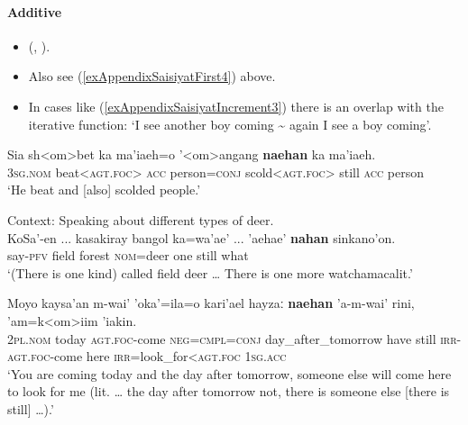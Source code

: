 \paragraph{Additive}\label{appendixSaisiyatAdditive}
\begin{itemize}
	\item \citeauthor{Huang2007} (\citeyear{Huang2007}, \citeyear[108–113]{Huang2008}).
	\item Also see (\ref{exAppendixSaisiyatFirst4}) above.
	\item In cases like (\ref{exAppendixSaisiyatIncrement3}) there is an overlap with the iterative function: \lq I see another boy coming \sim {} again I see a boy coming'.
\end{itemize}
\begin{exe}
	\ex
	\gll Sia sh<om>bet ka ma\rq{}iaeh=o \rq{}<om>angang \textbf{naehan} ka ma\rq{}iaeh.\\
	3\textsc{sg}.\textsc{nom} beat<\textsc{agt}.\textsc{foc}> \textsc{acc} person=\textsc{conj} scold<\textsc{agt}.\textsc{foc}> still \textsc{acc} person\\
	\glt \lq He beat and [also] scolded people.' \parencite[16]{Wang2018}

	\ex Context: Speaking about different types of deer.\\
	\gll KoSa\rq{}-en ... kasakiray bangol ka=wa\rq{}ae\rq{} ... \rq{}aehae\rq{} \textbf{nahan} sinkano'on.\\
	say-\textsc{pfv} {} field forest \textsc{nom}=deer {} one still what\\
	\glt \lq (There is one kind) called field deer … There is one more watchamacalit.' \parencite[590]{Huang2007}
	
	\ex
	\gll Moyo kaysa\rq{}an m-wai\rq{} \rq{}oka\rq{}=ila=o kari\rq{}ael hayzaː \textbf{naehan} \rq{}a-m-wai\rq{} rini, 'am=k<om>iim \rq{}iakin.\\
	2\textsc{pl}.\textsc{nom} today \textsc{agt}.\textsc{foc}-come \textsc{neg}=\textsc{cmpl}=\textsc{conj} day\_after\_tomorrow have still \textsc{irr}-\textsc{agt}.\textsc{foc}-come here \textsc{irr}=look\_for<\textsc{agt}.\textsc{foc} 1\textsc{sg}.\textsc{acc}\\
	\glt \lq You are coming today and the day after tomorrow, someone else will come here to look for me (lit. … the day after tomorrow not, there is someone else [there is still] …).' \parencite[174]{ZeitounEtal2015}
	

\end{exe}
